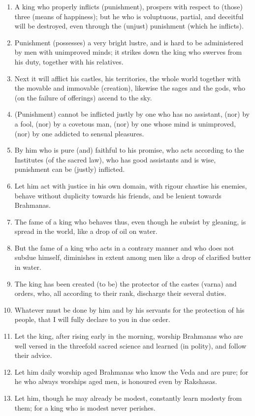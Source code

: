 \begin{enumerate}
\item A king who properly inflicts (punishment), prospers with respect to (those) three (means of happiness); but he who is voluptuous, partial, and deceitful will be destroyed, even through the (unjust) punishment (which he inflicts).
\item Punishment (possesses) a very bright lustre, and is hard to be administered by men with unimproved minds; it strikes down the king who swerves from his duty, together with his relatives.
\item Next it will afflict his castles, his territories, the whole world together with the movable and immovable (creation), likewise the sages and the gods, who (on the failure of offerings) ascend to the sky.
\item (Punishment) cannot be inflicted justly by one who has no assistant, (nor) by a fool, (nor) by a covetous man, (nor) by one whose mind is unimproved, (nor) by one addicted to sensual pleasures.
\item By him who is pure (and) faithful to his promise, who acts according to the Institutes (of the sacred law), who has good assistants and is wise, punishment can be (justly) inflicted.
\item Let him act with justice in his own domain, with rigour chastise his enemies, behave without duplicity towards his friends, and be lenient towards Brahmanas.
\item The fame of a king who behaves thus, even though he subsist by gleaning, is spread in the world, like a drop of oil on water.
\item But the fame of a king who acts in a contrary manner and who does not subdue himself, diminishes in extent among men like a drop of clarified butter in water.
\item The king has been created (to be) the protector of the castes (varna) and orders, who, all according to their rank, discharge their several duties.
\item Whatever must be done by him and by his servants for the protection of his people, that I will fully declare to you in due order.
\item Let the king, after rising early in the morning, worship Brahmanas who are well versed in the threefold sacred science and learned (in polity), and follow their advice.
\item Let him daily worship aged Brahmanas who know the Veda and are pure; for he who always worships aged men, is honoured even by Rakshasas.
\item Let him, though he may already be modest, constantly learn modesty from them; for a king who is modest never perishes.

\end{enumerate}
